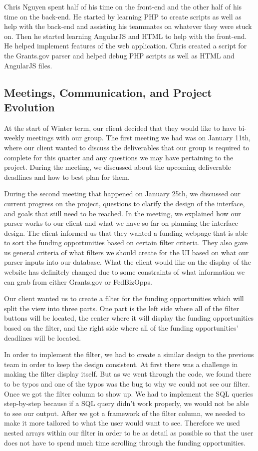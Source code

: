 \documentclass[onecolumn]{IEEEtran}
\begin{document}
Chris Nguyen spent half of his time on the front-end and the other half of his time on the back-end. He started by learning PHP to create scripts as well as help with the back-end and assisting his teammates on whatever they were stuck on. Then he started learning AngularJS and HTML to help with the front-end. He helped implement features of the web application. Chris created a script for the Grants.gov parser and helped debug PHP scripts as well as HTML and AngularJS files.  

\subsection{Meetings, Communication, and Project Evolution}
At the start of Winter term, our client decided that they would like to have bi-weekly meetings with our group. The first meeting we had was on January 11th,  where our client wanted to discuss the deliverables that our group is required to complete for this quarter and any questions we may have pertaining to the project. During the meeting, we discussed about the upcoming deliverable deadlines and how to best plan for them. 

During the second meeting that happened on January 25th, we discussed our current progress on the project, questions to clarify the design of the interface, and goals that still need to be reached. In the meeting, we explained how our parser works to our client and what we have so far on planning the interface design. The client informed us that they wanted a funding webpage that is able to sort the funding opportunities based on certain filter criteria. They also gave us general criteria of what filters we should create for the UI based on what our parser inputs into our database. What the client would like on the display of the website has definitely changed due to some constraints of what information we can grab from either Grants.gov or FedBizOpps.  

Our client wanted us to create a filter for the funding opportunities which will split the view into three parts. One part is the left side where all of the filter buttons will be located, the center where it will display the funding opportunities based on the filter, and the right side where all of the funding opportunities' deadlines will be located.  

In order to implement the filter, we had to create a similar design to the previous team in order to keep the design consistent. At first there was a challenge in making the filter display itself. But as we went through the code, we found there to be typos and one of the typos was the bug to why we could not see our filter. Once we got the filter column to show up. We had to implement the SQL queries step-by-step because if a SQL query didn't work properly, we would not be able to see our output. After we got a framework of the filter column, we needed to make it more tailored to what the user would want to see. Therefore we used nested arrays within our filter in order to be as detail as possible so that the user does not have to spend much time scrolling through the funding opportunities. 
\end{document}
